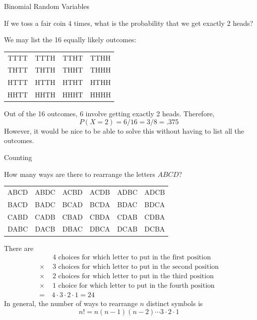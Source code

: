 \documentclass[xcolor=table]{beamer}
\begin{document}
\begin{frame}{Binomial Random Variables}
\begin{block}{}
If we toss a fair coin 4 times, what is the probability that we get exactly 2 heads?
\end{block}

\pause We may list the 16 equally likely outcomes:
\begin{center}\begin{tabular}{cccc}
TTTT & TTTH & TTHT & \cellcolor{cyan}TTHH \\
THTT & \cellcolor{cyan}THTH & \cellcolor{cyan}THHT & THHH \\
HTTT & \cellcolor{cyan}HTTH & \cellcolor{cyan}HTHT & HTHH \\
\cellcolor{cyan}HHTT & HHTH & HHHT & HHHH
\end{tabular}\end{center}
\pause Out of the 16 outcomes, 6 involve getting exactly 2 heads. Therefore,
$$P(X=2)=6/16=3/8 = .375$$
\pause However, it would be nice to be able to solve this without having to list all the outcomes.
\end{frame}

\begin{frame}{Counting}
\begin{block}{}
How many ways are there to rearrange the letters $ABCD$?
\end{block}
\pause \begin{center}\begin{tabular}{cccccc}
ABCD & ABDC & ACBD & ACDB & ADBC & ADCB \\
BACD & BADC & BCAD & BCDA & BDAC & BDCA \\
CABD & CADB & CBAD & CBDA & CDAB & CDBA \\
DABC & DACB & DBAC & DBCA & DCAB & DCBA
\end{tabular}\end{center}
\pause There are
\begin{align*}
&\text{ 4 choices for which letter to put in the first position}\\
\times & \text{ 3 choices for which letter to put in the second position}\\
\times & \text{ 2 choices for which letter to put in the third position}\\
\times & \text{ 1 choice for which letter to put in the fourth position}\\
= &\ 4\cdot 3\cdot2\cdot1 = 24
\end{align*}
\pause In general, the number of ways to rearrange $n$ distinct symbols is
$$n! = n(n-1)(n-2)\cdots3\cdot2\cdot1$$
\end{frame}
\end{document}
